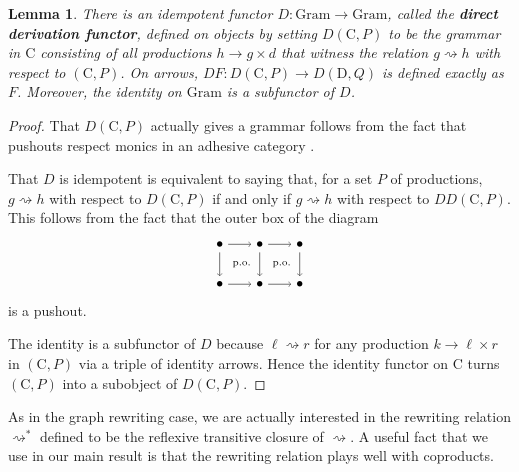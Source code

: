 \documentclass{amsart}
\newcommand{\C}{\cat{C}}
\newcommand{\D}{\cat{D}}
\newcommand{\Gram}{\cat{Gram}}
\newcommand{\defn}[1]{\textbf{#1}}
\newcommand{\cat}[1]{\mathrm{#1}}
\newcommand{\from}{\colon}
\newcommand{\dderiv}[2]{#1 \rightsquigarrow #2}
\newcommand{\deriv}[2]{#1 \rightsquigarrow^\ast #2}
\newcommand{\spn}[3]{#2 \to #1 \times #3}
\newtheorem{lemma}[theorem]{Lemma}
\theoremstyle{remark}
\theoremstyle{definition}
\begin{document}
\begin{lemma}
  There is an idempotent functor $ D \from \Gram \to \Gram $, called
  the \defn{direct derivation functor}, defined on objects by setting
  $ D ( \C , P ) $ to be the grammar in $ \C $ consisting of all
  productions $ \spn{g}{h}{d} $ that witness the relation
  $ \dderiv{g}{h} $ with respect to $ ( \C , P ) $. On arrows,
  $ DF \from D( \C , P ) \to D( \D , Q ) $ is defined exactly as
  $ F $.  Moreover, the identity on $ \Gram $ is a subfunctor of
  $ D $.
\end{lemma}

\begin{proof}
  That $ D ( \C , P ) $ actually gives a grammar follows from the fact
  that pushouts respect monics in an adhesive category
  \cite[Lem.~12]{LackSobo_Adhesive}.
  
  That $ D $ is idempotent is equivalent to saying that, for a set
  $ P $ of productions, $ \dderiv{g}{h} $ with respect to
  $ D ( \C , P ) $ if and only if $ \dderiv{g}{h} $ with respect to
  $ DD ( \C , P ) $. This follows from the fact that the outer box of
  the diagram
    \[
      \begin{tikzpicture}
        \node (1) at (0,1) {\( \bullet \)};
        \node (2) at (1,1) {\( \bullet \)};
        \node (3) at (2,1) {\( \bullet \)};
        \node (4) at (0,0) {\( \bullet \)};
        \node (5) at (1,0) {\( \bullet \)};
        \node (6) at (2,0) {\( \bullet \)};
        \draw [->] (1) to node [] {\scriptsize{\(  \)}} (2);
        \draw [->] (2) to node [] {\scriptsize{\(  \)}} (3);
        \draw [->] (4) to node [] {\scriptsize{\(  \)}} (5);
        \draw [->] (5) to node [] {\scriptsize{\(  \)}} (6);
        \draw [->] (1) to node [] {\scriptsize{\(  \)}} (4);
        \draw [->] (2) to node [] {\scriptsize{\(  \)}} (5);
        \draw [->] (3) to node [] {\scriptsize{\(  \)}} (6);
        \node () at (0.5,0.5) {\scriptsize{ p.o.\ }};
        \node () at (1.5,0.5) {\scriptsize{ p.o.\ }};
      \end{tikzpicture}
    \]
    is a pushout.

    The identity is a subfunctor of $ D $ because $ \dderiv{\ell}{r} $
    for any production $ \spn{\ell }{k}{r} $ in $ ( \C , P ) $ via a
    triple of identity arrows. Hence the identity functor on $ \C $
    turns $ ( \C , P ) $ into a subobject of $ D ( \C , P ) $.  
\end{proof}

As in the graph rewriting case, we are actually interested in the
rewriting relation $ \deriv{}{} $ defined to be the reflexive
transitive closure of $ \dderiv{}{} $.  A useful fact that we use in
our main result is that the rewriting relation plays well with
coproducts.
\end{document}
